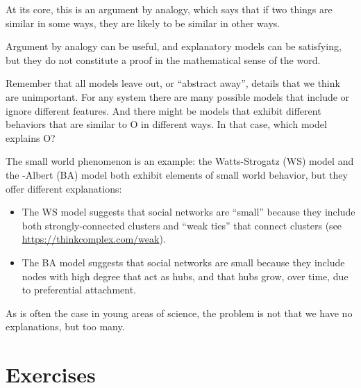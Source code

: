 \documentclass[12pt]{book}
\theoremstyle{exercise}
\begin{document}
At its core, this is an argument by analogy, which says that if two
things are similar in some ways, they are likely to be similar in
other ways.


Argument by analogy can be useful, and explanatory models can be
satisfying, but they do not constitute a proof in the mathematical
sense of the word.


Remember that all models leave out, or ``abstract away'',
details that we think are unimportant.  For any system there
are many possible models that include or ignore different features.
And there might be models that exhibit different behaviors that are similar to O in different ways.
In that case, which model explains O?


The small world phenomenon is an example: the Watts-Strogatz (WS)
model and the \Barabasi-Albert (BA) model both exhibit elements of
small world behavior, but they offer different explanations:

\begin{itemize}

\item The WS model suggests that social networks are ``small'' because
  they include both strongly-connected clusters and ``weak ties'' that
  connect clusters (see \url{https://thinkcomplex.com/weak}).


\item The BA model suggests that social networks are small because
  they include nodes with high degree that act as hubs, and that
  hubs grow, over time, due to preferential attachment.


\end{itemize}

As is often the case in young areas of science, the problem is
not that we have no explanations, but too many.


\section{Exercises}
\end{document}
